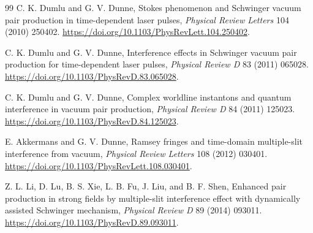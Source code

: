 \documentclass[a4paper,fleqn]{cas-dc}
\begin{document}
\begin{thebibliography}{99}
C. K. Dumlu and G. V. Dunne, Stokes phenomenon and Schwinger vacuum pair production in time-dependent laser pulses, \textit{Physical Review Letters} 104 (2010) 250402. \url{https://doi.org/10.1103/PhysRevLett.104.250402}.

C. K. Dumlu and G. V. Dunne, Interference effects in Schwinger vacuum pair production for time-dependent laser pulses, \textit{Physical Review D} 83 (2011) 065028. \url{https://doi.org/10.1103/PhysRevD.83.065028}.

C. K. Dumlu and G. V. Dunne, Complex worldline instantons and quantum interference in vacuum pair production, \textit{Physical Review D} 84 (2011) 125023. \url{https://doi.org/10.1103/PhysRevD.84.125023}.

E. Akkermans and G. V. Dunne, Ramsey fringes and time-domain multiple-slit interference from vacuum, \textit{Physical Review Letters} 108 (2012) 030401. \url{https://doi.org/10.1103/PhysRevLett.108.030401}.

Z. L. Li, D. Lu, B. S. Xie, L. B. Fu, J. Liu, and B. F. Shen, Enhanced pair production in strong fields by multiple-slit interference effect with dynamically assisted Schwinger mechanism, \textit{Physical Review D} 89 (2014) 093011. \url{https://doi.org/10.1103/PhysRevD.89.093011}.

\end{thebibliography}
\end{document}
